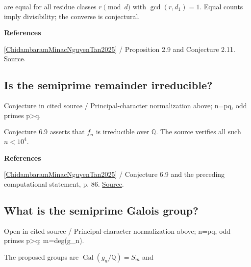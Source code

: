 \documentclass[11pt,a4paper,oneside,openany]{book}
\newcommand{\atlasdisplay}[1]{\par\begingroup\centering\vspace{3pt}\noindent\adjustbox{max width=\linewidth}{\(\displaystyle #1\)}\par\vspace{5pt}\endgroup}
\newenvironment{sources}{\par\smallskip\begingroup\footnotesize\color{atlasgray}\leftskip=10pt\setlength{\parskip}{2pt}}{\par\endgroup\smallskip}
\begin{document}
\atlasdisplay{\#\{1\le a\le n:\gcd(a,n)=1,\ a\equiv r\pmod d\}}
\color{black} are equal for all residue classes \(r\pmod d\) with \(\gcd(r,d_1)=1\). Equal counts imply divisibility; the converse is conjectural.\par
\begin{sources}
\textbf{References}\par\smallskip
\noindent\hyperlink{ref:ChidambaramMinacNguyenTan2025}{[ChidambaramMinacNguyenTan2025]} / Proposition 2.9 and Conjecture 2.11.  \href{https://jexpmath.org/index.php/jem/article/view/Vol-1Issue-1Paper-4}{Source}.\par
\end{sources}\color{black}
\subsection*{Is the semiprime remainder irreducible?}
{\small\sffamily\color{atlasgold}Conjecture in cited source / Principal-character normalization above; n=pq, odd primes p>q.}\par\smallskip
\color{black} Conjecture 6.9 asserts that \(f_n\) is irreducible over \(\mathbb Q\). The source verifies all such \(n<10^4\).\par
\begin{sources}
\textbf{References}\par\smallskip
\noindent\hyperlink{ref:ChidambaramMinacNguyenTan2025}{[ChidambaramMinacNguyenTan2025]} / Conjecture 6.9 and the preceding computational statement, p. 86.  \href{https://jexpmath.org/index.php/jem/article/view/Vol-1Issue-1Paper-4}{Source}.\par
\end{sources}\color{black}
\subsection*{What is the semiprime Galois group?}
{\small\sffamily\color{atlasgold}Open in cited source / Principal-character normalization above; n=pq, odd primes p>q; m=deg(g\_\allowbreak{}n).}\par\smallskip
\color{black} The proposed groups are \(\operatorname{Gal}(g_n/\mathbb Q)=S_m\) and\par
\end{document}
